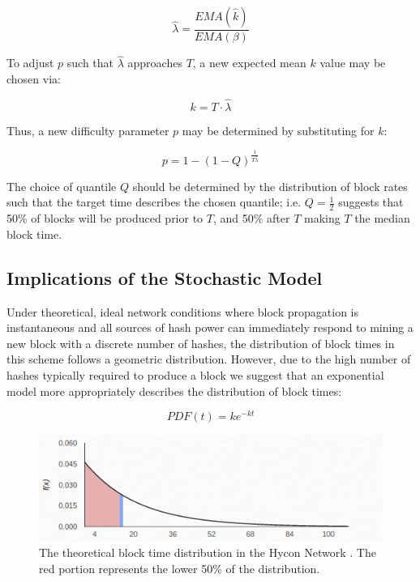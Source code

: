 \documentclass[]{article}
\begin{document}
\begin{equation}
\hat{\lambda} = \frac{EMA(\hat{k})}{EMA(\beta)}
\end{equation}

To adjust $p$ such that $\hat{\lambda}$ approaches $T$, a new expected mean $k$ value may be chosen via:

\begin{equation}
	k = T \cdot \hat{\lambda}
\end{equation} 

Thus, a new difficulty parameter $p$ may be determined by substituting for $k$: 

\begin{equation}
p = 1 - (1 - Q)^\frac{1}{T \hat{\lambda}} 
\end{equation}

The choice of quantile $Q$ should be determined by the distribution of block rates such that the target time describes the chosen quantile; i.e. $Q = \frac{1}{2}$ suggests that 50\% of blocks will be produced prior to $T$, and 50\% after $T$ making $T$ the median block time.

\subsection{Implications of the Stochastic Model}  
Under theoretical, ideal network conditions where block propagation is instantaneous and all sources of hash power can immediately respond to mining a new block with a discrete number of hashes, the distribution of block times in this scheme follows a geometric distribution.  However, due to the high number of hashes typically required to produce a block we suggest that an exponential model more appropriately describes the distribution of block times: 

\begin{equation}
PDF(t) = ke^{-kt}
\end{equation}

\begin{figure}[h]
	\centering
	\includegraphics[width=0.7\linewidth]{"./ideal hycon"}
	\caption{\footnotesize The theoretical block time distribution in the Hycon Network \cite{HyconNetwork}. The red portion represents the lower 50\% of the distribution. \cite{GammaDistHycon}}
\end{figure}
\end{document}
